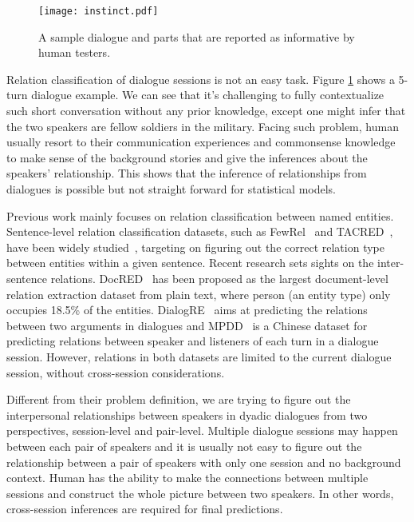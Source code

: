 \documentclass[letterpaper]{article} \usepackage{aaai21}  \usepackage{times}  \usepackage{helvet} \usepackage{courier}  \usepackage[hyphens]{url}  \usepackage{graphicx} \usepackage{xcolor}
\begin{document}
\begin{figure}[t!]
	\centering
	\texttt{[image: instinct.pdf]}
	\caption{A sample dialogue and parts that are 
		reported as informative by human testers. }
	\label{fig:instinct}
\end{figure}

Relation classification of dialogue sessions is not an easy task. Figure \ref{fig:instinct} shows a 5-turn dialogue example. We can see that it's challenging to fully contextualize such short conversation without any prior knowledge, 
except one might infer that the two speakers are fellow soldiers 
in the military. Facing such problem, human usually resort to their 
communication experiences and commonsense knowledge to make sense of the background stories and give the inferences about the speakers' relationship. This shows that the inference of relationships from dialogues is possible but not straight forward for statistical models.

Previous work mainly focuses on relation classification between named entities. 
Sentence-level relation classification datasets, such as FewRel~\cite{HanZYWYLS18} and  TACRED~\cite{ZhangZCAM17}, have been widely studied~\cite{Zhang0M18,GaoH0S19,ZhangHLJSL19}, targeting on figuring out the correct relation type between entities within a given sentence. Recent research sets sights on the 
inter-sentence relations. DocRED~\cite{YaoYLHLLLHZS19} has been proposed 
as the largest document-level relation extraction dataset from plain text, 
where person (an entity type) only occupies 18.5\% of the entities. 
DialogRE~\cite{YuSCY20} aims at predicting the relations between two arguments 
in dialogues and MPDD~\cite{ChenHC20} is a Chinese dataset for predicting relations between speaker and listeners of each turn in a dialogue session.
However, relations in both datasets are limited to the current dialogue session, without cross-session considerations.


Different from their problem definition, we are trying to figure out the interpersonal 
relationships between speakers in dyadic dialogues from two perspectives, session-level and pair-level.
Multiple dialogue sessions may happen between each pair of speakers and 
it is usually not easy to figure out the relationship between 
a pair of speakers with only one session and no background context. 
Human has the ability to make the connections between multiple sessions 
and construct the whole picture between two speakers. 
In other words, cross-session inferences are required for final predictions. 
\end{document}
